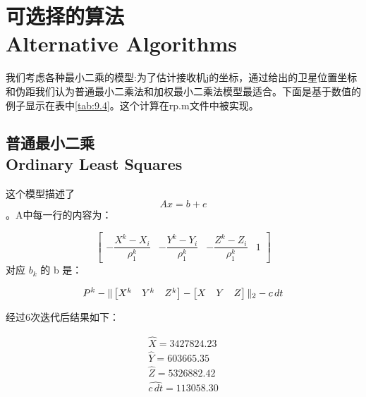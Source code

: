 \section[可选择的算法]{可选择的算法\\Alternative Algorithms}
	我们考虑各种最小二乘的模型:为了估计接收机j的坐标，通过给出的卫星位置坐标和伪距我们认为普通最小二乘法和加权最小二乘法模型最适合。下面是基于数值的例子显示在表中\ref{tab:9.4}。这个计算在rp.m文件中被实现。
	\subsection[普通最小二乘]{普通最小二乘\\Ordinary Least Squares}
	这个模型描述了$$ Ax=b+e $$。A中每一行的内容为：

		\[ 

			\begin{bmatrix}

				-\dfrac{X^k-X_i}{\rho^k_1} & -\dfrac{Y^k-Y_i}{\rho^k_1} & -\dfrac{Z^k-Z_i}{\rho^k_1} & 1

			\end{bmatrix} 

		\]
	对应 $b_k$ 的 b 是：

		\[

			P^k - \Arrowvert 

			\begin{bmatrix}

			X^k & Y^k & Z^k

			\end{bmatrix}-

			\begin{bmatrix}

			X & Y & Z

			\end{bmatrix}

			\Arrowvert_2

			-c\,dt

		\]

	经过6次迭代后结果如下：

		\[

		\begin{split}

		\hat{X} = 3427824.23 \\

		\hat{Y} =  603665.35 \\

		\hat{Z} = 5326882.42 \\

		\hat{c\,dt} =  113058.30

		\end{split}

		\]

